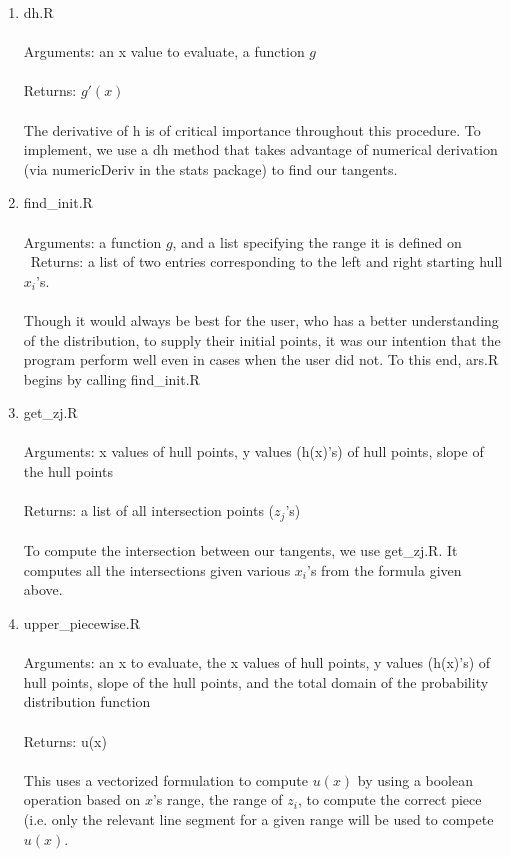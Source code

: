 \documentclass[12pt, oneside]{article}
\begin{document}
\begin{enumerate}

\item dh.R\\\\
Arguments: an x value to evaluate, a function \(g\)\\\\
Returns: \(g'(x)\)\\\\
The derivative of h is of critical importance throughout this procedure.  To implement, we use a dh method that takes advantage of numerical derivation (via numericDeriv in the stats package) to find our tangents.\\

\item find\_init.R\\\\
Arguments: a function \(g\), and a list specifying the range it is defined on\\\
Returns: a list of two entries corresponding to the left and right starting hull \(x_i\)'s.\\\\
Though it would always be best for the user, who has a better understanding of the distribution, to supply their initial points, it was our intention that the program perform well even in cases when the user did not.  To this end, ars.R begins by calling find\_init.R\\

\item get\_zj.R\\\\
Arguments: x values of hull points, y values (h(x)'s) of hull points, slope of the hull points\\\\
Returns: a list of all intersection points (\(z_j\)'s)\\\\
To compute the intersection between our tangents, we use get\_zj.R.  It computes all the intersections given various \(x_i\)'s from the formula given above.\\

\item upper\_piecewise.R\\\\
Arguments: an x to evaluate, the x values of hull points, y values (h(x)'s) of hull points, slope of the hull points, and the total domain of the probability distribution function\\\\
Returns: u(x)\\\\
This uses a vectorized formulation to compute \(u(x)\) by using a boolean operation based on \(x\)'s range, the range of \(z_i\), to compute the correct piece (i.e. only the relevant line segment for a given range will be used to compete \(u(x)\).


\end{enumerate}
\end{document}
